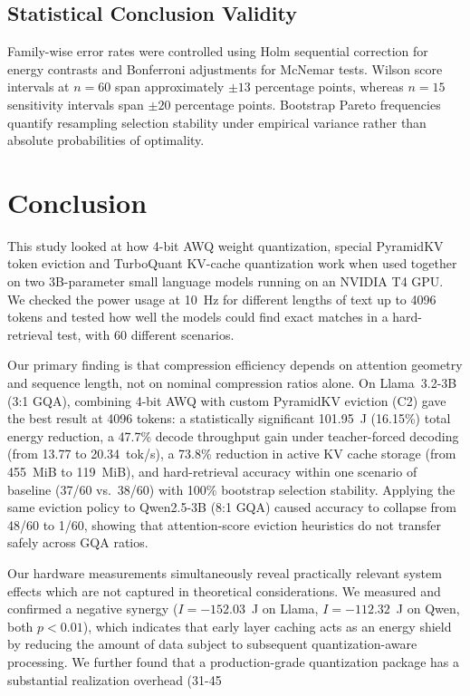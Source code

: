 \documentclass[sigconf,nonacm]{acmart}
\begin{document}
\subsection{Statistical Conclusion Validity}
Family-wise error rates were controlled using Holm sequential correction for energy contrasts and Bonferroni adjustments for McNemar tests. Wilson score intervals at $n=60$ span approximately $\pm 13$ percentage points, whereas $n=15$ sensitivity intervals span $\pm 20$ percentage points. Bootstrap Pareto frequencies quantify resampling selection stability under empirical variance rather than absolute probabilities of optimality.


\section{Conclusion}

This study looked at how 4-bit AWQ weight quantization, special PyramidKV token eviction and TurboQuant KV-cache quantization work when used together on two 3B-parameter small language models running on an NVIDIA T4 GPU. We checked the power usage at 10~Hz for different lengths of text up to 4096 tokens and tested how well the models could find exact matches in a hard-retrieval test, with 60 different scenarios.

Our primary finding is that compression efficiency depends on attention geometry and sequence length, not on nominal compression ratios alone. On Llama~3.2-3B (3:1 GQA), combining 4-bit AWQ with custom PyramidKV eviction (C2) gave the best result at 4096 tokens: a statistically significant 101.95~J (16.15\%) total energy reduction, a 47.7\% decode throughput gain under teacher-forced decoding (from 13.77 to 20.34~tok/s), a 73.8\% reduction in active KV cache storage (from 455~MiB to 119~MiB), and hard-retrieval accuracy within one scenario of baseline (37/60 vs.\ 38/60) with 100\% bootstrap selection stability. Applying the same eviction policy to Qwen2.5-3B (8:1 GQA) caused accuracy to collapse from 48/60 to 1/60, showing that attention-score eviction heuristics do not transfer safely across GQA ratios.

Our hardware measurements simultaneously reveal practically relevant system effects which are not captured in theoretical considerations. We measured and confirmed a negative synergy ($I = -152.03$~J on Llama, $I = -112.32$~J on Qwen, both $p < 0.01$), which indicates that early layer caching acts as an energy shield by reducing the amount of data subject to subsequent quantization-aware processing. We further found that a production-grade quantization package has a substantial realization overhead (31-45%
\end{document}
